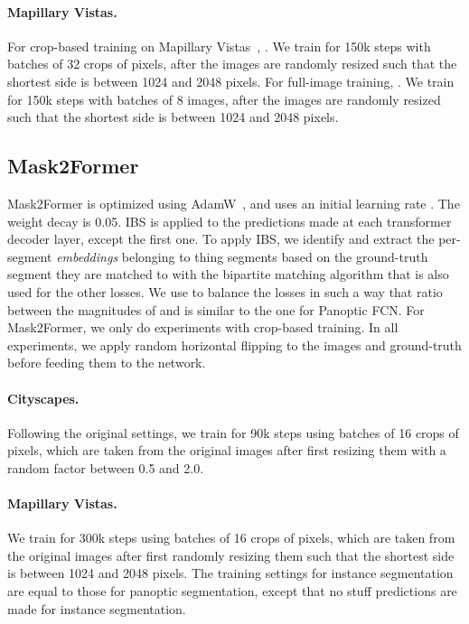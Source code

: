 \documentclass[10pt,twocolumn,letterpaper]{article}
\begin{document}
\paragraph{Mapillary Vistas.}
For crop-based training on Mapillary Vistas~\cite{neuhold2017mapillary}, . We train for 150k steps with batches of 32 crops of  pixels, after the images are randomly resized such that the shortest side is between 1024 and 2048 pixels. For full-image training, . We train for 150k steps with batches of 8 images, after the images are randomly resized such that the shortest side is between 1024 and 2048 pixels.

\subsection{Mask2Former}
Mask2Former is optimized using AdamW~\cite{loshchilov2019adamw}, and uses an initial learning rate . The weight decay is 0.05. IBS is applied to the predictions made at each transformer decoder layer, except the first one. To apply IBS, we identify and extract the per-segment \textit{embeddings} belonging to thing segments based on the ground-truth segment they are matched to with the bipartite matching algorithm that is also used for the other losses. We use  to balance the losses in such a way that ratio between the magnitudes of  and  is similar to the one for Panoptic FCN. For Mask2Former, we only do experiments with crop-based training. In all experiments, we apply random horizontal flipping to the images and ground-truth before feeding them to the network.


\paragraph{Cityscapes.}
Following the original settings, we train for 90k steps using batches of 16 crops of  pixels, which are taken from the original images after first resizing them with a random factor between 0.5 and 2.0.

\paragraph{Mapillary Vistas.}
We train for 300k steps using batches of 16 crops of  pixels, which are taken from the original images after first randomly resizing them such that the shortest side is between 1024 and 2048 pixels. The training settings for instance segmentation are equal to those for panoptic segmentation, except that no stuff predictions are made for instance segmentation. 
\end{document}
